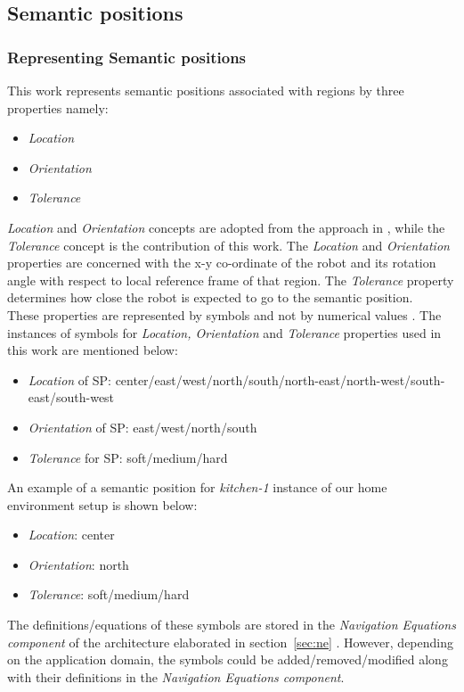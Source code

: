 \subsection{Semantic positions}
\label{sec:semanticposition}
\subsubsection{Representing Semantic positions}
This work represents semantic positions associated with regions by three properties namely:
  \begin{itemize}
    \item \textit{Location}
    \item \textit{Orientation} 
    \item \textit{Tolerance} 
  \end{itemize}
\textit{Location} and \textit{Orientation} concepts are adopted from the approach in \cite{1}, while the \textit{Tolerance} concept is the contribution of this work.
The \textit{Location} and \textit{Orientation} properties are concerned with the x-y co-ordinate of the robot and its rotation angle with respect to local reference frame of that region.
The \textit{Tolerance} property determines how close the robot is expected to go to the semantic position.\\

These properties are represented by symbols and not by numerical values \cite{1}.
The instances of symbols for \textit{Location, Orientation} and \textit{Tolerance} properties used in this work are mentioned below:
\begin{itemize}
  \item \textit{Location} of SP: center/east/west/north/south/north-east/north-west/south-east/south-west
  \item \textit{Orientation} of SP: east/west/north/south
  \item \textit{Tolerance} for SP: soft/medium/hard
\end{itemize}
An example of a semantic position for \textit{kitchen-1} instance of our home environment setup is shown below:
\begin{itemize}
  \item \textit{Location}: center
  \item \textit{Orientation}: north
  \item \textit{Tolerance}: soft/medium/hard
\end{itemize}
The definitions/equations of these symbols are stored in the \textit{Navigation Equations component} of the architecture elaborated in section~\ref{sec:ne} .
However, depending on the application domain, the symbols could be added/removed/modified along with their definitions in the \textit{Navigation Equations component}.\\

